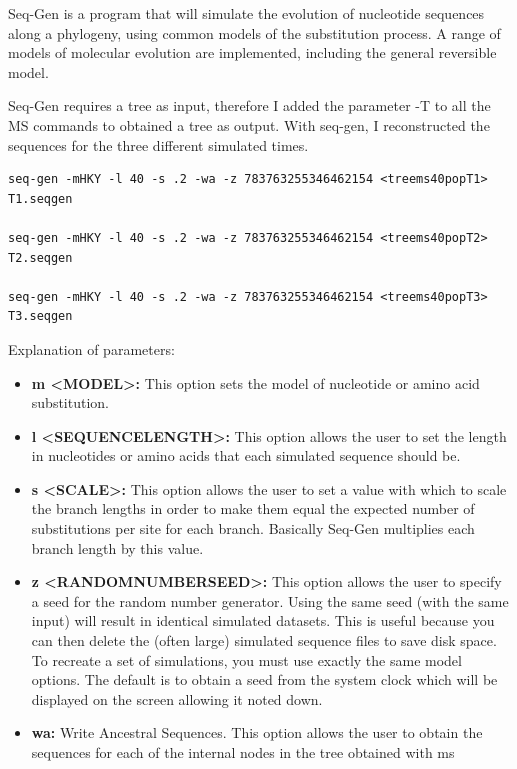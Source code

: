 \begin{itemize}
Seq-Gen \cite{rambaut1997seq} is a program that will simulate the evolution of nucleotide sequences along a phylogeny, using common models of the substitution process. A range of models of molecular evolution are implemented, including the general reversible model. 

Seq-Gen requires a tree as input, therefore I added the parameter -T to all the MS commands to obtained a tree as output. With seq-gen, I reconstructed the sequences for the three different simulated times.

\begin{verbatim}
seq-gen -mHKY -l 40 -s .2 -wa -z 783763255346462154 <treems40popT1> T1.seqgen

seq-gen -mHKY -l 40 -s .2 -wa -z 783763255346462154 <treems40popT2> T2.seqgen

seq-gen -mHKY -l 40 -s .2 -wa -z 783763255346462154 <treems40popT3> T3.seqgen

\end{verbatim}

Explanation of parameters:

\begin{itemize}

\item\textbf{m <MODEL>:} This option sets the model of nucleotide or amino acid substitution.
\item\textbf{l <SEQUENCELENGTH>:} This option allows the user to set the length in nucleotides or amino acids that each simulated sequence should be.
\item\textbf{s <SCALE>:} This option allows the user to set a value with which to scale the branch lengths in order to make them equal the expected number of substitutions per site for each branch. Basically Seq-Gen multiplies each branch length by this value.
\item\textbf{z <RANDOMNUMBERSEED>:} This option allows the user to specify a seed for the random number generator. Using the same seed (with the same input) will result in identical simulated datasets. This is useful because you can then delete the (often large) simulated sequence files to save disk space. To recreate a set of simulations, you must use exactly the same model options. The default is to obtain a seed from the system clock which will be displayed on the screen allowing it noted down.
\item\textbf{wa:}
Write Ancestral Sequences. This option allows the user to obtain the sequences for each of the internal nodes in the tree obtained with ms 
\end{itemize}

\end{itemize}

